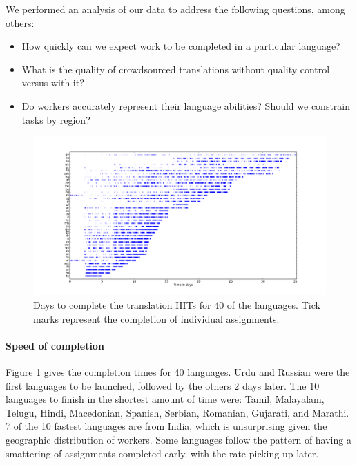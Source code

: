 \documentclass[11pt]{article}
\begin{document}
We performed an analysis of our data to address the following questions, among others:
\begin{itemize}
\item How quickly can we expect work to be completed in a particular language? 
\item What is the quality of crowdsourced translations without quality control versus with it? 
\item Do workers accurately represent their language abilities?  Should we constrain tasks by region? 
\end{itemize}


\begin{figure}[h]
\centering
\includegraphics[height=\linewidth,angle=270]{final-figures/completetime}
\caption{Days to complete the translation HITs for 40 of the languages. Tick marks represent the completion of individual assignments. }
\label{completion-time}
\end{figure}

\paragraph{Speed of completion}

Figure \ref{completion-time} gives the completion times for 40 languages.  
Urdu and Russian were the first languages to be launched, followed by the others 2 days later. The 10 languages to finish in the shortest amount of time were: Tamil, Malayalam, Telugu, Hindi, Macedonian, Spanish, Serbian, Romanian, Gujarati, and Marathi. 7 of the 10 fastest languages are from India, which is unsurprising given the geographic distribution of workers.  Some languages follow the pattern of having a smattering of assignments completed early, with the rate picking up later. 
\end{document}
